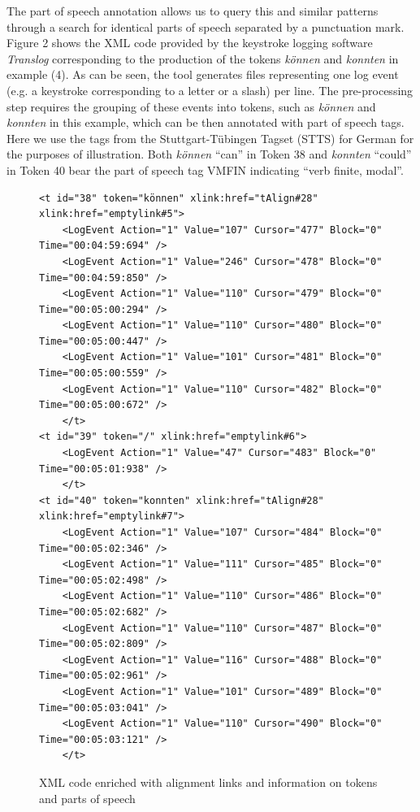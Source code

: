 \documentclass[output=paper]{LSP/langsci}
\begin{document}
The part of speech annotation allows us to query this and similar patterns through a search for identical parts of speech separated by a punctuation mark. 
Figure 2 shows the XML code provided by the keystroke logging software \textit{Translog} corresponding to the production of the tokens \textit{können} and \textit{konnten} in example (4). As can be seen, the tool generates files representing one log event (e.g. a keystroke corresponding to a letter or a slash) per line. The pre-processing step requires the grouping of these events into tokens, such as \textit{können} and \textit{konnten} in this example, which can be then annotated with part of speech tags. Here we use the tags from the Stuttgart-Tübingen Tagset (STTS) for German \citep{Schiller1999} for the purposes of illustration. Both \textit{können} “can” in Token 38 and \textit{konnten} “could” in Token 40 bear the part of speech tag VMFIN indicating “verb finite, modal”. 


\begin{figure}

\caption{XML code enriched with alignment links and information on tokens and parts of speech}
\begin{lstlisting}
<t id="38" token="können" xlink:href="tAlign#28" xlink:href="emptylink#5">
    <LogEvent Action="1" Value="107" Cursor="477" Block="0" Time="00:04:59:694" />
    <LogEvent Action="1" Value="246" Cursor="478" Block="0" Time="00:04:59:850" />
    <LogEvent Action="1" Value="110" Cursor="479" Block="0" Time="00:05:00:294" />
    <LogEvent Action="1" Value="110" Cursor="480" Block="0" Time="00:05:00:447" />
    <LogEvent Action="1" Value="101" Cursor="481" Block="0" Time="00:05:00:559" />
    <LogEvent Action="1" Value="110" Cursor="482" Block="0" Time="00:05:00:672" />
	</t>
<t id="39" token="/" xlink:href="emptylink#6">
    <LogEvent Action="1" Value="47" Cursor="483" Block="0" Time="00:05:01:938" />
	</t>
<t id="40" token="konnten" xlink:href="tAlign#28" xlink:href="emptylink#7">
    <LogEvent Action="1" Value="107" Cursor="484" Block="0" Time="00:05:02:346" />
    <LogEvent Action="1" Value="111" Cursor="485" Block="0" Time="00:05:02:498" />
    <LogEvent Action="1" Value="110" Cursor="486" Block="0" Time="00:05:02:682" />
    <LogEvent Action="1" Value="110" Cursor="487" Block="0" Time="00:05:02:809" />
    <LogEvent Action="1" Value="116" Cursor="488" Block="0" Time="00:05:02:961" />
    <LogEvent Action="1" Value="101" Cursor="489" Block="0" Time="00:05:03:041" />
    <LogEvent Action="1" Value="110" Cursor="490" Block="0" Time="00:05:03:121" />
	</t>
\end{lstlisting}

\end{figure} 
\end{document}

